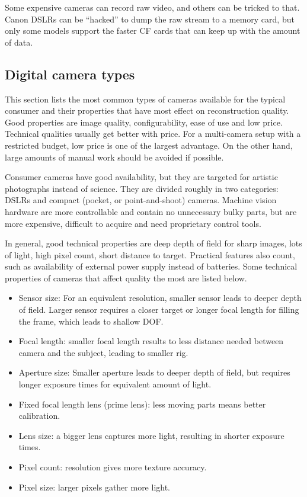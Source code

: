Some expensive cameras can record raw video, and others can be tricked to that.
Canon DSLRs can be ``hacked'' to dump the raw stream to a memory card, but only some models support the faster CF cards that can keep up with the amount of data.


\subsection{Digital camera types} \label{seq:cameratypes} %


This section lists the most common types of cameras available for the typical consumer and their properties that have most effect on reconstruction quality.
Good properties are image quality, configurability, ease of use and low price.
Technical qualities usually get better with price.
For a multi-camera setup with a restricted budget, low price is one of the largest advantage.
On the other hand, large amounts of manual work should be avoided if possible.


Consumer cameras have good availability, but they are targeted for artistic photographs instead of science.
They are divided roughly in two categories: DSLRs and compact (pocket, or point-and-shoot) cameras.
Machine vision hardware are more controllable and contain no unnecessary bulky parts, but are more expensive, difficult to acquire and need proprietary control tools.

In general, good technical properties are deep depth of field for sharp images, lots of light, high pixel count, short distance to target.
Practical features also count, such as availability of external power supply instead of batteries.
Some technical properties of cameras that affect quality the most are listed below.

\begin{itemize}
	\item Sensor size: For an equivalent resolution, smaller sensor leads to deeper depth of field. Larger sensor requires a closer target or longer focal length for filling the frame, which leads to shallow DOF.
	\item Focal length: smaller focal length results to less distance needed between camera and the subject, leading to smaller rig.
	\item Aperture size: Smaller aperture leads to deeper depth of field, but requires longer exposure times for equivalent amount of light.
	\item Fixed focal length lens (prime lens): less moving parts means better calibration.
	\item Lens size: a bigger lens captures more light, resulting in shorter exposure times.
	\item Pixel count: resolution gives more texture accuracy.
	\item Pixel size: larger pixels gather more light.
\end{itemize}

